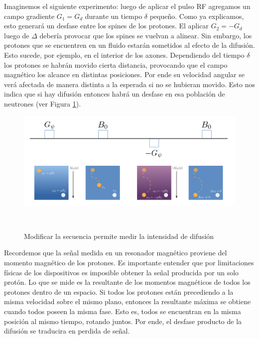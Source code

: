 Imaginemos el siguiente experimento: luego de aplicar el pulso RF agregamos un
campo gradiente $G_1=G_d$ durante un tiempo $\delta$ peque\~no. Como ya explicamos,
esto generar\'a un desfase entre los spines de los protones. El aplicar $G_2=-G_d$
luego de $\Delta$ deber\'ia provocar que los spines se vuelvan a alinear. Sin
embargo, los protones que se encuentren en un fluido estar\'an sometidos al
efecto de la difusi\'on. Esto sucede, por ejemplo, en el interior de los
axones. Dependiendo del tiempo $\delta$ los protones se habr\'an movido cierta
distancia, provocando que el campo magn\'etico los alcance en distintas 
posiciones. Por ende su velocidad angular se ver\'a afectada de manera distinta 
a la esperada si no se hubieran movido. Esto nos indica que si hay difusi\'on
entonces habr\'a un desfase en esa poblaci\'on de neutrones (ver Figura 
\ref{fig:dmri}).\\

\begin{figure}
                                                                                                                        
\begin{minipage}[b]{\textwidth}
    \includegraphics[width=\textwidth]{img/dmri.png}
    \caption{Modificar la secuencia permite medir la intensidad de difusi\'on}
    \label{fig:dmri}
\end{minipage} ~

\end{figure}  

Recordemos que la se\~nal medida en un resonador magn\'etico proviene del 
momento magn\'etico de los protones. Es importante entender que por limitaciones
f\'isicas de los dispositivos es imposible obtener la se\~nal producida por un
solo prot\'on. Lo que se mide es la resultante de los momentos magn\'eticos de 
todos los protones dentro de un espacio. Si todos los protones est\'an precediendo
a la misma velocidad sobre el mismo plano, entonces la resultante m\'axima se
obtiene cuando todos poseen la misma fase. Esto es, todos se encuentran en la
misma posici\'on al mismo tiempo, rotando juntos. Por ende, el desfase producto
de la difusi\'on se traducira en perdida de se\~nal.\\

